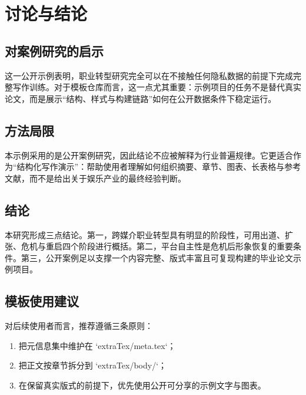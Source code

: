 \chapter{讨论与结论}

\section{对案例研究的启示}

这一公开示例表明，职业转型研究完全可以在不接触任何隐私数据的前提下完成完整写作训练。对于模板仓库而言，这一点尤其重要：示例项目的任务不是替代真实论文，而是展示“结构、样式与构建链路”如何在公开数据条件下稳定运行。

\section{方法局限}

本示例采用的是公开案例研究，因此结论不应被解释为行业普遍规律。它更适合作为“结构化写作演示”：帮助使用者理解如何组织摘要、章节、图表、长表格与参考文献，而不是给出关于娱乐产业的最终经验判断。

\section{结论}

本研究形成三点结论。第一，跨媒介职业转型具有明显的阶段性，可用出道、扩张、危机与重启四个阶段进行概括。第二，平台自主性是危机后形象恢复的重要条件。第三，公开案例足以支撑一个内容完整、版式丰富且可复现构建的毕业论文示例项目。

\section{模板使用建议}

对后续使用者而言，推荐遵循三条原则：
\begin{enumerate}
  \item 把元信息集中维护在 `extraTex/meta.tex`；
  \item 把正文按章节拆分到 `extraTex/body/`；
  \item 在保留真实版式的前提下，优先使用公开可分享的示例文字与图表。
\end{enumerate}

